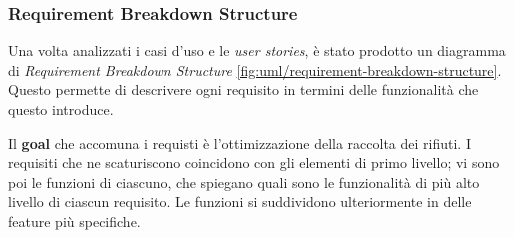 \subsubsection{Requirement Breakdown Structure}
Una volta analizzati i casi d'uso e le \textit{user stories}, è stato prodotto un diagramma di \textit{Requirement Breakdown Structure} \ref{fig:uml/requirement-breakdown-structure}. Questo permette di descrivere ogni requisito in termini delle funzionalità che questo introduce.

Il \textbf{goal} che accomuna i requisti è l'ottimizzazione della raccolta dei rifiuti. I requisiti che ne scaturiscono coincidono con gli elementi di primo livello; vi sono poi le funzioni di ciascuno, che spiegano quali sono le funzionalità di più alto livello di ciascun requisito. Le funzioni si suddividono ulteriormente in delle feature più specifiche.

